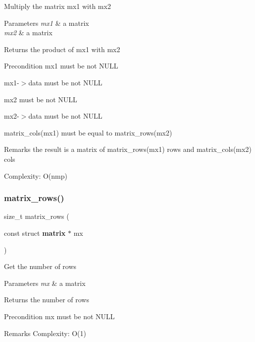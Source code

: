 Multiply the matrix {\ttfamily mx1} with {\ttfamily mx2}


\begin{DoxyParams}{Parameters}
{\em mx1} & a matrix \\
\hline
{\em mx2} & a matrix \\
\hline
\end{DoxyParams}
\begin{DoxyReturn}{Returns}
the product of {\ttfamily mx1} with {\ttfamily mx2}
\end{DoxyReturn}
\begin{DoxyPrecond}{Precondition}
{\ttfamily mx1} must be not N\+U\+LL 

{\ttfamily mx1-\/$>$data} must be not N\+U\+LL 

{\ttfamily mx2} must be not N\+U\+LL 

{\ttfamily mx2-\/$>$data} must be not N\+U\+LL 

{\ttfamily matrix\+\_\+cols(mx1)} must be equal to {\ttfamily matrix\+\_\+rows(mx2)}
\end{DoxyPrecond}
\begin{DoxyRemark}{Remarks}
the result is a matrix of {\ttfamily matrix\+\_\+rows(mx1)} rows and {\ttfamily matrix\+\_\+cols(mx2)} cols 

Complexity\+: O(nmp) 
\end{DoxyRemark}
\mbox{\label{matrix_8h_a7d9ca687a57f2328a02b9a056964b2fb}} 
\subsubsection{matrix\+\_\+rows()}
{\footnotesize\ttfamily size\+\_\+t matrix\+\_\+rows (\begin{DoxyParamCaption}\item[{const struct \textbf{ matrix} $\ast$}]{mx }\end{DoxyParamCaption})\hspace{0.3cm}{\ttfamily [inline]}}

Get the number of rows


\begin{DoxyParams}{Parameters}
{\em mx} & a matrix \\
\hline
\end{DoxyParams}
\begin{DoxyReturn}{Returns}
the number of rows
\end{DoxyReturn}
\begin{DoxyPrecond}{Precondition}
{\ttfamily mx} must be not N\+U\+LL
\end{DoxyPrecond}
\begin{DoxyRemark}{Remarks}
Complexity\+: O(1) 
\end{DoxyRemark}
\mbox{\label{matrix_8h_a9e159c4c2c953106b7a1a4f0d4a03616}} 
